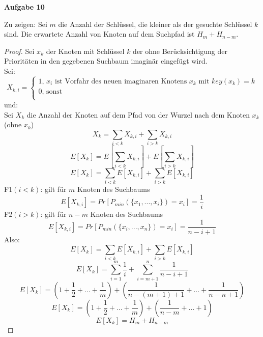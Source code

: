 \documentclass{article}
\begin{document}
{\noindent\bfseries Aufgabe 10}%
\medskip%

 Zu zeigen: Sei $m$ die Anzahl der Schlüssel, die kleiner als der gesuchte Schlüssel $k$ sind. Die erwartete Anzahl von Knoten auf dem Suchpfad ist $H_{m}+H_{n-m}$. 
\begin{proof}
\noindent

Sei $x_{k}$ der Knoten mit Schlüssel $k$ der ohne Berücksichtigung der Prioritäten in den gegebenen Suchbaum imaginär eingefügt wird.\\

Sei:\\
  \[
    X_{k,i}=\left\{
                \begin{array}{ll}
                  1\text{, } x_{i} \text{ ist Vorfahr des neuen imaginaren Knotens } x_{k} \text{ mit } key(x_{k})=k\\
                  0 \text{, sonst}\\
                
                \end{array}
              \right.
  \]
und:\\
Sei $X_{k}$ die Anzahl der Knoten auf dem Pfad von der Wurzel nach dem Knoten $x_{k}$ (ohne $x_{k}$)
\begin{equation}
X_{k}=\sum_{i<k} X_{k,i} +\sum_{i>k} X_{k,i}
\end{equation}
\begin{equation}
E[X_{k}]=E[\sum_{i<k} X_{k,i}] +E[\sum_{i>k} X_{k,i}]
\end{equation}
\begin{equation}
E[X_{k}]=\sum_{i<k} E[X_{k,i}] +\sum_{i>k} E[X_{k,i}]
\end{equation}
F1$(i<k)$: gilt für $m$ Knoten des Suchbaums\\
\begin{equation}
E[X_{k,i}]=Pr[P_{min}(\lbrace x_{1},...,x_{i}\rbrace)=x_{i}]=\frac{1}{i}
\end{equation}
F2$(i>k)$: gilt für $n-m$ Knoten des Suchbaums\\
\begin{equation}
E[X_{k,i}]=Pr[P_{min}(\lbrace x_{i},...,x_{n}\rbrace)=x_{i}]=\frac{1}{n-i+1}
\end{equation}
Also:\\
\begin{equation}
E[X_{k}]=\sum_{i<k} E[X_{k,i}] +\sum_{i>k} E[X_{k,i}]
\end{equation}
\begin{equation}
E[X_{k}]=\sum_{i=1}^{m} \frac{1}{i} +\sum_{i=m+1}^{n} \frac{1}{n-i+1}
\end{equation}
\begin{equation}
E[X_{k}]=(1+\frac{1}{2}+...+\frac{1}{m})+(\frac{1}{n-(m+1)+1}+...+\frac{1}{n-n+1})
\end{equation}
\begin{equation}
E[X_{k}]=(1+\frac{1}{2}+...+\frac{1}{m})+(\frac{1}{n-m}+...+1)
\end{equation}
\begin{equation}
E[X_{k}]=H_{m}+H_{n-m}
\end{equation}
\end{proof}
\end{document}
